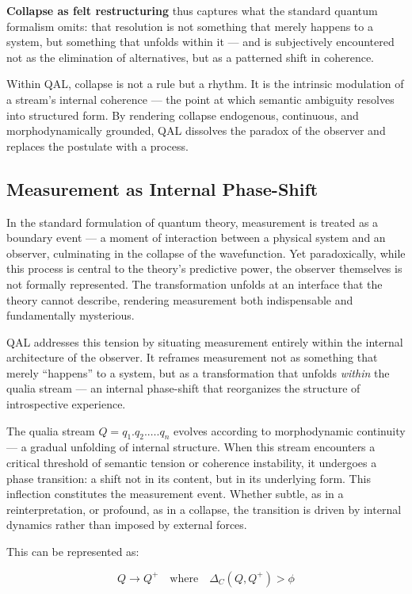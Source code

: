 \documentclass[11pt]{article}
\numberwithin{equation}{section} %
\begin{document}
\textbf{Collapse as felt restructuring} thus captures what the standard quantum formalism omits: that resolution is not something that merely happens to a system, but something that unfolds within it — and is subjectively encountered not as the elimination of alternatives, but as a patterned shift in coherence. 

Within QAL, collapse is not a rule but a rhythm. It is the intrinsic modulation of a stream’s internal coherence — the point at which semantic ambiguity resolves into structured form. By rendering collapse endogenous, continuous, and morphodynamically grounded, QAL dissolves the paradox of the observer and replaces the postulate with a process.

\subsection{Measurement as Internal Phase-Shift}

In the standard formulation of quantum theory, measurement is treated as a boundary event — a moment of interaction between a physical system and an observer, culminating in the collapse of the wavefunction. Yet paradoxically, while this process is central to the theory’s predictive power, the observer themselves is not formally represented. The transformation unfolds at an interface that the theory cannot describe, rendering measurement both indispensable and fundamentally mysterious.

QAL addresses this tension by situating measurement entirely within the internal architecture of the observer. It reframes measurement not as something that merely “happens” to a system, but as a transformation that unfolds \textit{within} the qualia stream — an internal phase-shift that reorganizes the structure of introspective experience.

The qualia stream \( Q = q_1 . q_2 . \dots . q_n \) evolves according to morphodynamic continuity — a gradual unfolding of internal structure. When this stream encounters a critical threshold of semantic tension or coherence instability, it undergoes a phase transition: a shift not in its content, but in its underlying form. This inflection constitutes the measurement event. Whether subtle, as in a reinterpretation, or profound, as in a collapse, the transition is driven by internal dynamics rather than imposed by external forces.

This can be represented as:

\begin{equation}
Q \rightarrow Q^+ \quad \text{where} \quad \Delta_C(Q, Q^+) > \phi
\end{equation}
\end{document}

